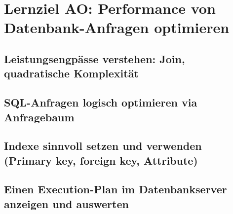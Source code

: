 \section{Lernziel AO: Performance von Datenbank-Anfragen optimieren}

\subsection{Leistungsengpässe verstehen: Join, quadratische Komplexität}

\subsection{SQL-Anfragen logisch optimieren via Anfragebaum}

\subsection{Indexe sinnvoll setzen und verwenden (Primary key, foreign key, Attribute)}

\subsection{Einen Execution-Plan im Datenbankserver anzeigen und auswerten}